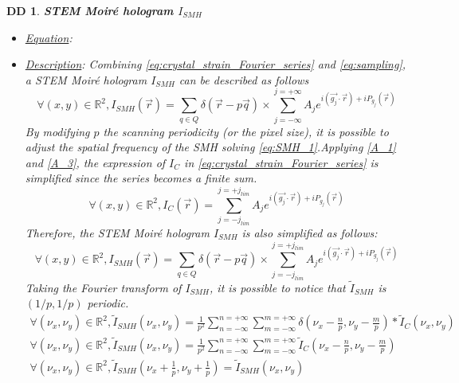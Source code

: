 \documentclass[12pt]{article}
\newtheorem{DD}{DD}
\begin{document}
\begin{DD}
\label{DD_2}
\noindent\colorbox{shadecolorDD}{\normalfont \textbf{STEM Moir{\'e} hologram $I_{SMH}$}}
\normalfont
\begin{itemize}
\item \underline{Equation}: 
\item \underline{Description}: Combining \cref{eq:crystal_strain_Fourier_series} and \cref{eq:sampling}, a STEM Moir{\'e} hologram $I_{SMH}$ can be described as follows
\begin{equation}
\forall (x,y) \in \mathbb{R}^{2}, I_{SMH}(\vec{r})=\sum_{q\in Q}\delta(\vec{r}-p\vec{q})\times\sum_{j=-\infty}^{j=+\infty}A_je^{i(\vec{g_j}\cdot\vec{r})+iP_{g_{j}}(\vec{r})}
\label{eq:SMH_1}
\end{equation}
By modifying $p$ the scanning periodicity (or the pixel size), it is possible to adjust the spatial frequency of the SMH solving \cref{eq:SMH_1}.Applying \cref{A_1} and \cref{A_3}, the expression of $I_C$ in \cref{eq:crystal_strain_Fourier_series} is simplified since the series becomes a finite sum.
\begin{equation}
\forall (x,y) \in \mathbb{R}^{2},I_C(\vec{r})=\sum_{j=-j_{lim}}^{j=+j_{lim}}A_je^{i(\vec{g_j}\cdot\vec{r})+iP_{g_{j}}(\vec{r})}
\label{eq:crystal_lattice_simplified}
\end{equation}
Therefore, the STEM Moir{\'e} hologram $I_{SMH}$ is also simplified as follows:
\begin{equation}
\forall (x,y) \in \mathbb{R}^{2}, I_{SMH}(\vec{r})=\sum_{q\in Q}\delta(\vec{r}-p\vec{q})\times\sum_{j=-j_{lim}}^{j=+j_{lim}}A_je^{i(\vec{g_j}\cdot\vec{r})+iP_{g_{j}}(\vec{r})}
\label{eq:SMH_simplified_1}
\end{equation}
Taking the Fourier transform of $I_{SMH}$, it is possible to notice that $\widetilde{I}_{SMH}$ is $(1/p,1/p)$ periodic.  
\begin{equation}
\begin{gathered}
\forall (\nu_x,\nu_y) \in \mathbb{R}^{2}, \widetilde{I}_{SMH}(\nu_x,\nu_y)=\frac{1}{p^2}\sum_{n=-\infty}^{n=+\infty}\sum_{m=-\infty}^{m=+\infty}\delta(\nu_x-\frac{n}{p},\nu_y-\frac{m}{p})\ast\widetilde{I}_{C}(\nu_x,\nu_y) \\
\forall (\nu_x,\nu_y) \in \mathbb{R}^{2}, \widetilde{I}_{SMH}(\nu_x,\nu_y)=\frac{1}{p^2}\sum_{n=-\infty}^{n=+\infty}\sum_{m=-\infty}^{m=+\infty}\widetilde{I}_{C}(\nu_x-\frac{n}{p},\nu_y-\frac{m}{p}) \\
\forall (\nu_x,\nu_y) \in \mathbb{R}^{2}, \widetilde{I}_{SMH}(\nu_x+\frac{1}{p},\nu_y+\frac{1}{p})=\widetilde{I}_{SMH}(\nu_x,\nu_y)

\end{gathered}
\end{equation}
\end{itemize}
\end{DD}
\end{document}
